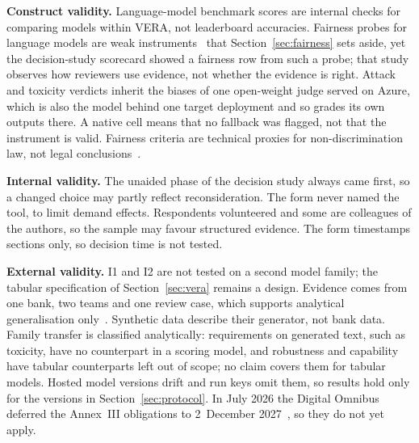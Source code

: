 \textbf{Construct validity.}
Language-model benchmark scores are internal checks for comparing models within VERA, not leaderboard accuracies.
Fairness probes for language models are weak instruments~\cite{blodgett2021stereotyping,raji2021everything,reuel2024betterbench} that Section~\ref{sec:fairness} sets aside, yet the decision-study scorecard showed a fairness row from such a probe; that study observes how reviewers use evidence, not whether the evidence is right.
Attack and toxicity verdicts inherit the biases of one open-weight judge served on Azure, which is also the model behind one target deployment and so grades its own outputs there.
A native cell means that no fallback was flagged, not that the instrument is valid.
Fairness criteria are technical proxies for non-discrimination law, not legal conclusions~\cite{wachter2021fairness}.

\textbf{Internal validity.}
The unaided phase of the decision study always came first, so a changed choice may partly reflect reconsideration.
The form never named the tool, to limit demand effects.
Respondents volunteered and some are colleagues of the authors, so the sample may favour structured evidence.
The form timestamps sections only, so decision time is not tested.

\textbf{External validity.}
\ifarmwithdrawn
I1 and I2 are not tested on a second model family; the tabular specification of Section~\ref{sec:vera} remains a design.
\fi
Evidence comes from one bank, two teams and one review case, which supports analytical generalisation only~\cite{runeson2009guidelines}.
%
Synthetic data describe their generator, not bank data.
Family transfer is classified analytically: requirements on generated text, such as toxicity, have no counterpart in a scoring model, and robustness and capability have tabular counterparts left out of scope; no claim covers them for tabular models.
Hosted model versions drift and run keys omit them, so results hold only for the versions in Section~\ref{sec:protocol}.
In July 2026 the Digital Omnibus deferred the Annex~III obligations to 2~December 2027~\cite{euomnibus2026ai}, so they do not yet apply.

